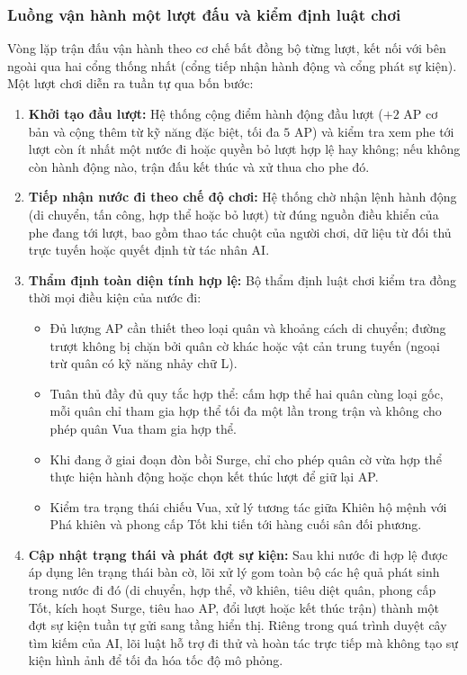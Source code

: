 \subsubsection{Luồng vận hành một lượt đấu và kiểm định luật chơi}
Vòng lặp trận đấu vận hành theo cơ chế bất đồng bộ từng lượt, kết nối với bên ngoài qua hai cổng thống nhất (cổng tiếp nhận hành động và cổng phát sự kiện). Một lượt chơi diễn ra tuần tự qua bốn bước:
\begin{enumerate}
    \item \textbf{Khởi tạo đầu lượt:} Hệ thống cộng điểm hành động đầu lượt ($+2$ AP cơ bản và cộng thêm từ kỹ năng đặc biệt, tối đa $5$ AP) và kiểm tra xem phe tới lượt còn ít nhất một nước đi hoặc quyền bỏ lượt hợp lệ hay không; nếu không còn hành động nào, trận đấu kết thúc và xử thua cho phe đó.
    \item \textbf{Tiếp nhận nước đi theo chế độ chơi:} Hệ thống chờ nhận lệnh hành động (di chuyển, tấn công, hợp thể hoặc bỏ lượt) từ đúng nguồn điều khiển của phe đang tới lượt, bao gồm thao tác chuột của người chơi, dữ liệu từ đối thủ trực tuyến hoặc quyết định từ tác nhân AI.
    \item \textbf{Thẩm định toàn diện tính hợp lệ:} Bộ thẩm định luật chơi kiểm tra đồng thời mọi điều kiện của nước đi:
    \begin{itemize}
        \item Đủ lượng AP cần thiết theo loại quân và khoảng cách di chuyển; đường trượt không bị chặn bởi quân cờ khác hoặc vật cản trung tuyến (ngoại trừ quân có kỹ năng nhảy chữ L).
        \item Tuân thủ đầy đủ quy tắc hợp thể: cấm hợp thể hai quân cùng loại gốc, mỗi quân chỉ tham gia hợp thể tối đa một lần trong trận và không cho phép quân Vua tham gia hợp thể.
        \item Khi đang ở giai đoạn đòn bồi Surge, chỉ cho phép quân cờ vừa hợp thể thực hiện hành động hoặc chọn kết thúc lượt để giữ lại AP.
        \item Kiểm tra trạng thái chiếu Vua, xử lý tương tác giữa Khiên hộ mệnh với Phá khiên và phong cấp Tốt khi tiến tới hàng cuối sân đối phương.
    \end{itemize}
    \item \textbf{Cập nhật trạng thái và phát đợt sự kiện:} Sau khi nước đi hợp lệ được áp dụng lên trạng thái bàn cờ, lõi xử lý gom toàn bộ các hệ quả phát sinh trong nước đi đó (di chuyển, hợp thể, vỡ khiên, tiêu diệt quân, phong cấp Tốt, kích hoạt Surge, tiêu hao AP, đổi lượt hoặc kết thúc trận) thành một đợt sự kiện tuần tự gửi sang tầng hiển thị. Riêng trong quá trình duyệt cây tìm kiếm của AI, lõi luật hỗ trợ đi thử và hoàn tác trực tiếp mà không tạo sự kiện hình ảnh để tối đa hóa tốc độ mô phỏng.
\end{enumerate}

